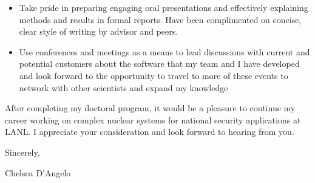 \begin{center}
\begin{minipage}{\textwidth}
\begin{itemize}[leftmargin=.875in,rightmargin=.75in,itemsep=1.0mm]
               \item Take pride in preparing engaging oral presentations and 
                     effectively explaining methods and results in 
                     formal reports.  Have been 
                     complimented on concise, clear
                     style of writing by advisor and peers. 
	       \item Use conferences and meetings as a means to lead
		       discussions with current and potential customers about
		       the software that my team and I have developed and look forward to the opportunity to travel to
		       more of these events to network with other
			scientists and expand my knowledge
		       


\end{itemize} 

\vspace{4mm} %



After completing my doctoral program, it would be a pleasure 
to continue my career working on complex nuclear systems for
national security applications at LANL.  
I appreciate your consideration and look forward to hearing from you. 
  \vspace{4mm}
  
  Sincerely, \\ \vspace{-4mm}
  
  
  Chelsea D'Angelo
  
  \endgroup
  
  \end{minipage}
\end{center}
